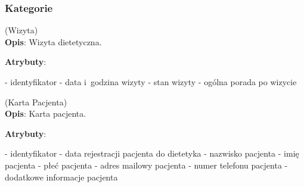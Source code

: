 \subsubsection{Kategorie}\label{subsubsec:database:appointments:categories}
\begin{enumerate}[label={\textbf{KAT/5/\protect\twodigits{\theenumi}}}, wide, labelwidth=!, labelindent=0pt, labelsep=0pt, series=reqs]
    \setlength\itemsep{1.75em}
    \label{kat:Appointment} (Wizyta)\\
    \indent\textbf{Opis}: Wizyta dietetyczna.
    \par
    \textbf{Atrybuty}:
    \begin{itemize}[series=atr, wide, align=left, leftmargin=190pt]
        \label{kat:Appointment:id}- identyfikator
        \label{kat:Appointment:appointmentDate}- data i~godzina wizyty
        \label{kat:Appointment:appointmentState}- stan wizyty
        \label{kat:Appointment:generalAdvice}- ogólna porada po wizycie
    \end{itemize}

    \label{kat:PatientCard} (Karta Pacjenta)\\
    \indent\textbf{Opis}: Karta pacjenta.
    \par
    \textbf{Atrybuty}:
    \begin{itemize}[series=atr, wide, align=left, leftmargin=190pt]
        \label{kat:PatientCard:id}- identyfikator
        \label{kat:PatientCard:creationDate}- data rejestracji pacjenta do dietetyka
        \label{kat:PatientCard:patientLastName}- nazwisko pacjenta
        \label{kat:PatientCard:patientFirstName}- imię pacjenta
        \label{kat:PatientCard:patientGender}- płeć pacjenta
        \label{kat:PatientCard:patientEmail}- adres mailowy pacjenta
        \label{kat:PatientCard:patientPhone}- numer telefonu pacjenta
        \label{kat:PatientCard:additionalPatientInfo}- dodatkowe informacje pacjenta
    \end{itemize}


\end{enumerate}
